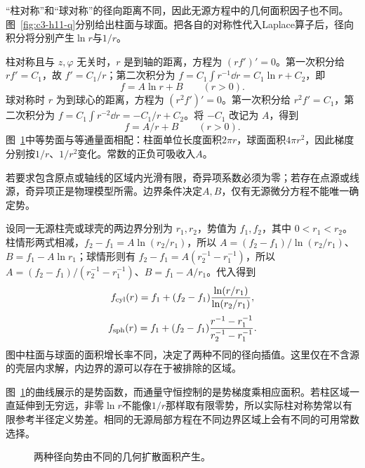 \begin{solution}
“柱对称”和“球对称”的径向距离不同，因此无源方程中的几何面积因子也不同。图~\ref{fig:c3-h11-q}分别给出柱面与球面。把各自的对称性代入Laplace算子后，径向积分将分别产生$\ln r$与$1/r$。


柱对称且与 $z,\varphi$ 无关时，$r$ 是到轴的距离，方程为 $(rf')'=0$。第一次积分给 $rf'=C_1$，故 $f'=C_1/r$；第二次积分为 $f=C_1\int r^{-1}\dd r=C_1\ln r+C_2$，即
\[\boxed{f=A\ln r+B\qquad(r>0)}.
\]
球对称时 $r$ 为到球心的距离，方程为 $(r^2f')'=0$。第一次积分给 $r^2f'=C_1$，第二次积分为 $f=C_1\int r^{-2}\dd r=-C_1/r+C_2$。将 $-C_1$ 改记为 $A$，得到
\[\boxed{f=A/r+B\qquad(r>0)}.
\]
图~\ref{fig:c3-h11-s}中等势面与等通量面相配：柱面单位长度面积$2\pi r$，球面面积$4\pi r^2$，因此梯度分别按$1/r$、$1/r^2$变化。常数的正负可吸收入$A$。

若要求包含原点或轴线的区域内光滑有限，奇异项系数必须为零；若存在点源或线源，奇异项正是物理模型所需。边界条件决定$A,B$，仅有无源微分方程不能唯一确定势。


设同一无源柱壳或球壳的两边界分别为 $r_1,r_2$，势值为 $f_1,f_2$，其中 $0<r_1<r_2$。柱情形两式相减，$f_2-f_1=A\ln(r_2/r_1)$，所以 $A=(f_2-f_1)/\ln(r_2/r_1)$、$B=f_1-A\ln r_1$；球情形则有 $f_2-f_1=A(r_2^{-1}-r_1^{-1})$，所以 $A=(f_2-f_1)/(r_2^{-1}-r_1^{-1})$、$B=f_1-A/r_1$。代入得到
\[f_{\rm cyl}(r)=f_1+(f_2-f_1)\frac{\ln(r/r_1)}{\ln(r_2/r_1)},\]
\[f_{\rm sph}(r)=f_1+(f_2-f_1)\frac{r^{-1}-r_1^{-1}}{r_2^{-1}-r_1^{-1}}.\]
图中柱面与球面的面积增长率不同，决定了两种不同的径向插值。这里仅在不含源的壳层内求解，内边界的源可以存在于被排除的区域。


图~\ref{fig:c3-h11-s}的曲线展示的是势函数，而通量守恒控制的是势梯度乘相应面积。若柱区域一直延伸到无穷远，非零$\ln r$不能像$1/r$那样取有限零势，所以实际柱对称势常以有限参考半径定义势差。相同的无源局部方程在不同边界区域上会有不同的可用常数选择。

\begin{figure}[H]\centering
{}
\caption{两种径向势由不同的几何扩散面积产生。}\label{fig:c3-h11-s}
\end{figure}
\end{solution}

